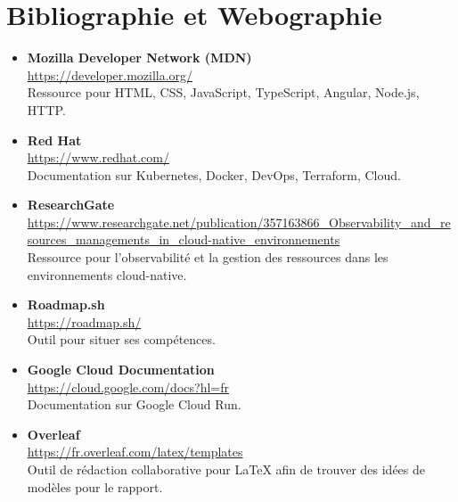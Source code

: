 \chapter*{Bibliographie et Webographie}

\begin{itemize}
    \item \textbf{Mozilla Developer Network (MDN)} \\
    \url{https://developer.mozilla.org/} \\
    Ressource pour HTML, CSS, JavaScript, TypeScript, Angular, Node.js, HTTP\@.

    \item \textbf{Red Hat} \\
    \url{https://www.redhat.com/} \\
    Documentation sur Kubernetes, Docker, DevOps, Terraform, Cloud.

    \item \textbf{ResearchGate} \\
    \url{https://www.researchgate.net/publication/357163866_Observability_and_resources_managements_in_cloud-native_environnements} \\
    Ressource pour l'observabilité et la gestion des ressources dans les environnements cloud-native.

    \item \textbf{Roadmap.sh} \\
    \url{https://roadmap.sh/} \\
    Outil pour situer ses compétences.

    \item \textbf{Google Cloud Documentation} \\
    \url{https://cloud.google.com/docs?hl=fr} \\
    Documentation sur Google Cloud Run.

    \item \textbf{Overleaf} \\
    \url{https://fr.overleaf.com/latex/templates} \\
    Outil de rédaction collaborative pour LaTeX afin de trouver des idées de modèles pour le rapport\@.
\end{itemize}
